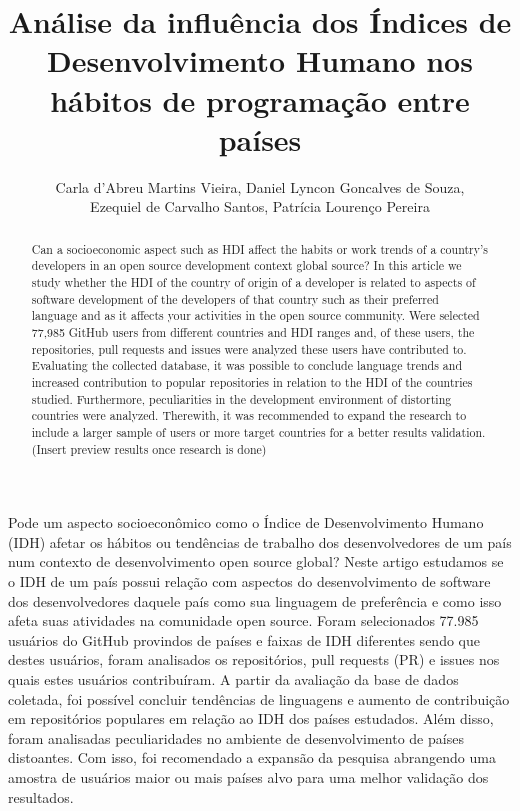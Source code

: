 \documentclass[12pt]{article}
\title{Análise da influência dos Índices de Desenvolvimento Humano nos hábitos de programação entre países}
\author{Carla d’Abreu Martins Vieira\inst{1}, Daniel Lyncon Goncalves de Souza\inst{1},\\ Ezequiel de Carvalho Santos\inst{1}, Patrícia Lourenço Pereira\inst{1}
}
\begin{document}
 

\maketitle

\begin{abstract}
  Can a socioeconomic aspect such as HDI affect the habits or work trends of
  a country's developers in an open source development context global source? 
  In this article we study whether the HDI of the country of origin of a
  developer is related to aspects of software development of the developers 
  of that country such as their preferred language and as it affects your 
  activities in the open source community. Were selected 77,985 GitHub users
  from different countries and HDI ranges and, of these users, the repositories,
  pull requests and issues were analyzed these users have contributed to. Evaluating the collected database, it was possible to conclude language trends and increased contribution to popular repositories in relation to the HDI of the countries studied. Furthermore, peculiarities in the development environment of distorting countries were analyzed. Therewith, it was recommended to expand the research to include a larger sample of users or more target countries for a better results validation.
  (Insert preview results once research is done)
\end{abstract}
     
\begin{resumo} 
  Pode um aspecto socioeconômico como o Índice de Desenvolvimento Humano (IDH) afetar os hábitos ou tendências de trabalho dos desenvolvedores de um país num contexto de desenvolvimento open source global? Neste artigo estudamos se o IDH de um país possui relação com aspectos do desenvolvimento de software  dos desenvolvedores daquele país como sua linguagem  de preferência e como  isso afeta suas atividades na comunidade open source. Foram selecionados 77.985 usuários do GitHub provindos de países e faixas de IDH diferentes sendo que destes usuários, foram analisados os repositórios, pull requests (PR) e issues nos quais estes usuários contribuíram. A partir da avaliação da base de dados coletada, foi possível concluir tendências de linguagens e aumento de contribuição em repositórios populares em relação ao IDH dos países estudados. Além disso, foram analisadas peculiaridades no ambiente de desenvolvimento de países distoantes. Com isso, foi recomendado a expansão da pesquisa abrangendo uma amostra de usuários maior ou mais países alvo para uma melhor validação dos resultados.
\end{resumo}
\end{document}
